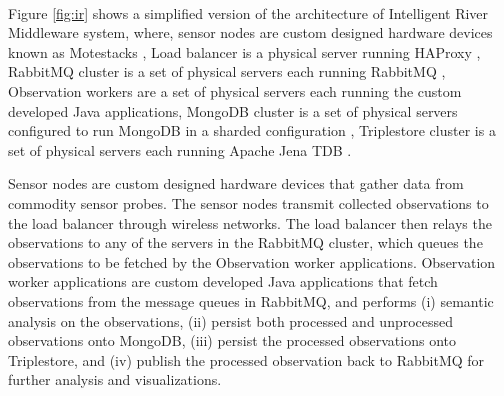 Figure \ref{fig:ir} shows a simplified version of the architecture of Intelligent River\textsuperscript{\textregistered} Middleware system, where, sensor nodes are custom designed hardware devices known as Motestacks \cite{motestack}, Load balancer is a physical server running HAProxy \cite{haproxy}, RabbitMQ cluster is a set of physical servers each running RabbitMQ \cite{rabbitmq}, Observation workers are a set of physical servers each running the custom developed Java applications, MongoDB cluster is a set of physical servers configured to run MongoDB in a sharded configuration \cite{mongosharding}, Triplestore cluster is a set of physical servers each running Apache Jena TDB \cite{tdb}.




Sensor nodes are custom designed hardware devices that gather data from commodity sensor probes. The sensor nodes transmit collected observations to the load balancer through wireless networks. The load balancer then relays the observations to any of the servers in the RabbitMQ cluster, which queues the observations to be fetched by the Observation worker applications. Observation worker applications are custom developed Java applications that fetch observations from the message queues in RabbitMQ, and performs (i) semantic analysis on the observations, (ii) persist both processed and unprocessed  observations onto MongoDB, (iii) persist the processed observations onto Triplestore, and (iv) publish the processed observation back to RabbitMQ for further analysis and visualizations.




















